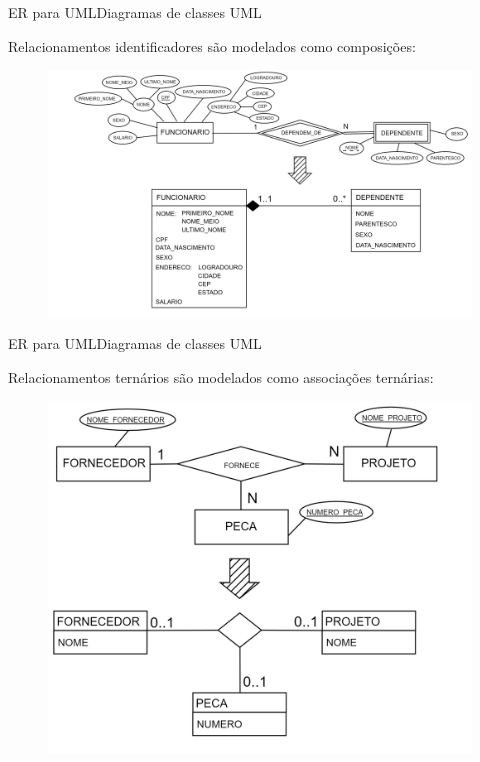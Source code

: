 \documentclass[t]{beamer}
\begin{document}
\begin{ftst}{ER para UML}{Diagramas de classes UML}

Relacionamentos identificadores são modelados como composições:

\vone
\begin{figure}
    \centering
    \includegraphics[scale=0.11]{Figuras/UML_6.png}

\end{figure}
\end{ftst}


\begin{ftst}{ER para UML}{Diagramas de classes UML}

Relacionamentos ternários são modelados como associações ternárias:

\vone
\begin{figure}
    \centering
    \includegraphics[scale=0.12]{Figuras/UML_7.png}

\end{figure}
\end{ftst}
\end{document}
